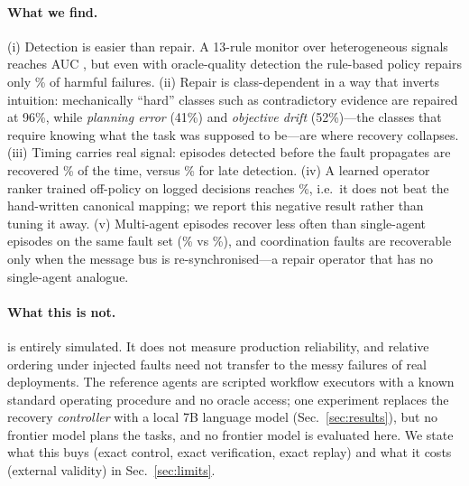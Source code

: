 \paragraph{What we find.} (i) Detection is easier than repair. A 13-rule monitor over
heterogeneous signals reaches AUC \AucRules{}, but even with oracle-quality detection the rule-based
policy repairs only \RecRules\% of harmful failures. (ii) Repair is class-dependent in a way that
inverts intuition: mechanically ``hard'' classes such as contradictory evidence are repaired at
96\%, while \emph{planning error} (41\%) and \emph{objective drift} (52\%)---the classes that
require knowing what the task was supposed to be---are where recovery collapses. (iii) Timing
carries real signal: episodes detected before the fault propagates are recovered \EarlyRec\% of the
time, versus \LateRec\% for late detection. (iv) A learned operator ranker trained off-policy on
logged decisions reaches \RecModel\%, i.e.\ it does not beat the hand-written canonical mapping; we
report this negative result rather than tuning it away. (v) Multi-agent episodes recover less often
than single-agent episodes on the same fault set (\MultiRecovery\% vs \SingleRecovery\%), and
coordination faults are recoverable only when the message bus is re-synchronised---a repair
operator that has no single-agent analogue.

\paragraph{What this is not.} \arb{} is entirely simulated. It does not measure production
reliability, and relative ordering under injected faults need not transfer to the messy failures of
real deployments. The reference agents are scripted workflow executors with a known standard
operating procedure and no oracle access; one experiment replaces the recovery \emph{controller}
with a local 7B language model (Sec.~\ref{sec:results}), but no frontier model plans the tasks, and
no frontier model is evaluated here. We state what this buys (exact control, exact verification,
exact replay) and what it costs (external validity) in Sec.~\ref{sec:limits}.
